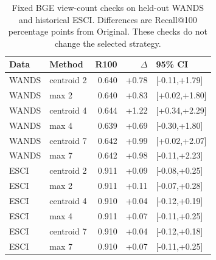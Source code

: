 \begin{table}[htbp]
\caption{Fixed BGE view-count checks on held-out WANDS and historical ESCI. Differences are Recall@100 percentage points from Original. These checks do not change the selected strategy.}\label{tab:saturation}
\centering\small
\begin{tabular}{llrrl}\toprule
Data & Method & R100 & $\Delta$ & 95\% CI\\\midrule
WANDS & centroid 2 & 0.640 & +0.78 & [-0.11,+1.79]\\
WANDS & max 2 & 0.640 & +0.83 & [+0.02,+1.80]\\
WANDS & centroid 4 & 0.644 & +1.22 & [+0.34,+2.29]\\
WANDS & max 4 & 0.639 & +0.69 & [-0.30,+1.80]\\
WANDS & centroid 7 & 0.642 & +0.99 & [+0.02,+2.07]\\
WANDS & max 7 & 0.642 & +0.98 & [-0.11,+2.23]\\
ESCI & centroid 2 & 0.911 & +0.09 & [-0.08,+0.25]\\
ESCI & max 2 & 0.911 & +0.11 & [-0.07,+0.28]\\
ESCI & centroid 4 & 0.910 & +0.04 & [-0.12,+0.19]\\
ESCI & max 4 & 0.911 & +0.07 & [-0.11,+0.25]\\
ESCI & centroid 7 & 0.910 & +0.04 & [-0.12,+0.18]\\
ESCI & max 7 & 0.910 & +0.07 & [-0.11,+0.25]\\
\bottomrule\end{tabular}
\end{table}
